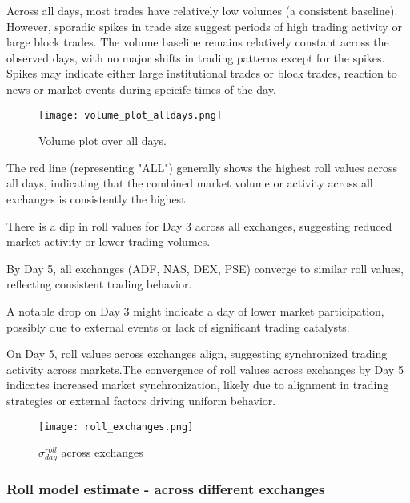 \documentclass{article}
\begin{document}
Across all days, most trades have relatively low volumes (a consistent baseline). However, sporadic spikes in trade size suggest periods of high trading activity or large block trades. The volume baseline remains relatively constant across the observed days, with no major shifts in trading patterns except for the spikes. Spikes may indicate either large institutional trades or block trades, reaction to news or market events during speicifc times of the day.


\begin{figure}[H]
\centering
\begin{adjustbox}{max width=\textwidth}
    \texttt{[image: volume\_plot\_alldays.png]}
\end{adjustbox}
\caption{Volume plot over all days.}
\label{fig:volume_plot_alldays}
\end{figure}

The red line (representing "ALL") generally shows the highest roll values across all days, indicating that the combined market volume or activity across all exchanges is consistently the highest.

There is a dip in roll values for Day 3 across all exchanges, suggesting reduced market activity or lower trading volumes.

By Day 5, all exchanges (ADF, NAS, DEX, PSE) converge to similar roll values, reflecting consistent trading behavior.

A notable drop on Day 3 might indicate a day of lower market participation, possibly due to external events or lack of significant trading catalysts.

On Day 5, roll values across exchanges align, suggesting synchronized trading activity across markets.The convergence of roll values  across exchanges by Day 5 indicates increased market synchronization, likely due to alignment in trading strategies or external factors driving uniform behavior.


\begin{figure}[H]
\centering
\begin{adjustbox}{max width=\textwidth}
    \texttt{[image: roll\_exchanges.png]}
\end{adjustbox}
\caption{$\sigma_{day}^{roll}$ across exchanges}
\label{fig:roll_vol_exhcnage}
\end{figure}


\subsubsection{Roll model estimate - across different exchanges}
\end{document}
